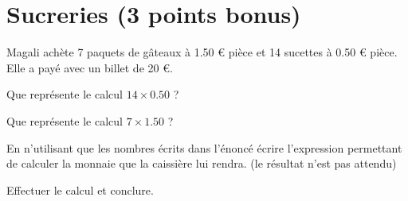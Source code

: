 \section{Sucreries (3 points bonus)}

Magali achète 7 paquets de gâteaux à \num{1.50} € pièce et 14 sucettes à \num{0.50} € pièce. Elle a payé avec un billet de 20 €.

\begin{questions}
	\question[\half] Que représente le calcul $14 \times \num{0.50}$ ?

	\question[\half] Que représente le calcul $7 \times \num{1.50}$ ?
	
	\question[1] En n'utilisant que les nombres écrits dans l'énoncé écrire l'expression permettant de calculer la monnaie que la caissière lui rendra. (le résultat n'est pas attendu)
		
	\question[1] Effectuer le calcul et conclure. 

	
\end{questions}